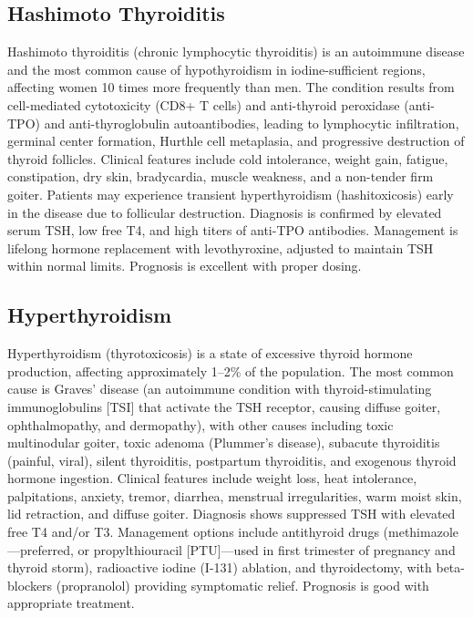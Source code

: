\subsection{Hashimoto Thyroiditis}
\label{sec:Hashimoto Thyroiditis}
Hashimoto thyroiditis (chronic lymphocytic thyroiditis) is an autoimmune disease and the most common cause of hypothyroidism in iodine-sufficient regions, affecting women 10 times more frequently than men. The condition results from cell-mediated cytotoxicity (CD8+ T cells) and anti-thyroid peroxidase (anti-TPO) and anti-thyroglobulin autoantibodies, leading to lymphocytic infiltration, germinal center formation, Hurthle cell metaplasia, and progressive destruction of thyroid follicles. Clinical features include cold intolerance, weight gain, fatigue, constipation, dry skin, bradycardia, muscle weakness, and a non-tender firm goiter. Patients may experience transient hyperthyroidism (hashitoxicosis) early in the disease due to follicular destruction. Diagnosis is confirmed by elevated serum TSH, low free T4, and high titers of anti-TPO antibodies. Management is lifelong hormone replacement with levothyroxine, adjusted to maintain TSH within normal limits. Prognosis is excellent with proper dosing.

\subsection{Hyperthyroidism}
\label{sec:Hyperthyroidism}
Hyperthyroidism (thyrotoxicosis) is a state of excessive thyroid hormone production, affecting approximately 1--2\% of the population. The most common cause is Graves' disease (an autoimmune condition with thyroid-stimulating immunoglobulins [TSI] that activate the TSH receptor, causing diffuse goiter, ophthalmopathy, and dermopathy), with other causes including toxic multinodular goiter, toxic adenoma (Plummer's disease), subacute thyroiditis (painful, viral), silent thyroiditis, postpartum thyroiditis, and exogenous thyroid hormone ingestion. Clinical features include weight loss, heat intolerance, palpitations, anxiety, tremor, diarrhea, menstrual irregularities, warm moist skin, lid retraction, and diffuse goiter. Diagnosis shows suppressed TSH with elevated free T4 and/or T3. Management options include antithyroid drugs (methimazole---preferred, or propylthiouracil [PTU]---used in first trimester of pregnancy and thyroid storm), radioactive iodine (I-131) ablation, and thyroidectomy, with beta-blockers (propranolol) providing symptomatic relief. Prognosis is good with appropriate treatment.

